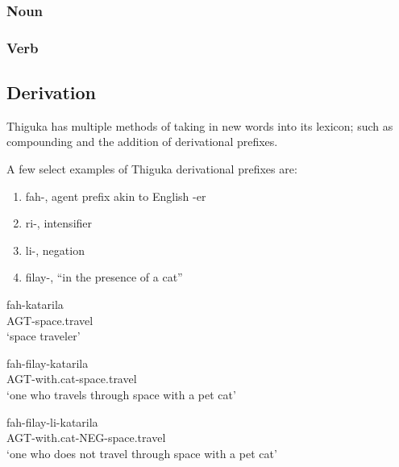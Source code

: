 \subsubsection{Noun}


\subsubsection{Verb}


\subsection{Derivation}
Thiguka has multiple methods of taking in new words into its lexicon; such as compounding and the addition of derivational prefixes.

A few select examples of Thiguka derivational prefixes are:

\begin{enumerate}
    \item fah-, agent prefix akin to English -er
    \item ri-, intensifier
    \item li-, negation
    \item filay-, ``in the presence of a cat''
\end{enumerate}

\begin{exe}
    \ex{} \gll{}fah-katarila\\
    AGT-space.travel\\
    \glt{}`space traveler'
\end{exe}

\begin{exe}
    \ex{} \gll{}fah-filay-katarila\\
    AGT-with.cat-space.travel\\
    \glt{}`one who travels through space with a pet cat'
\end{exe}

\begin{exe}
    \ex{} \gll{}fah-filay-li-katarila\\
    AGT-with.cat-NEG-space.travel\\
    \glt{}`one who does not travel through space with a pet cat'
\end{exe}

